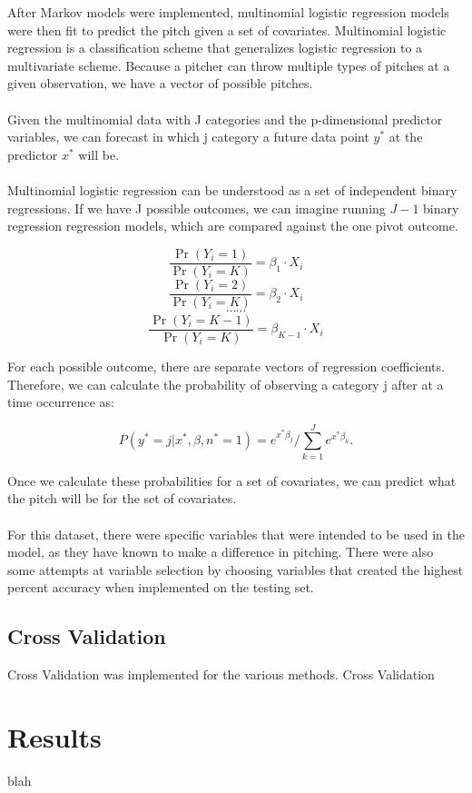 \documentclass{article}
\begin{document}
After Markov models were implemented, multinomial logistic regression models were then fit to predict the pitch given a set of covariates. Multinomial logistic regression is a classification scheme that generalizes logistic regression to a multivariate scheme. Because a pitcher can throw multiple types of pitches at a given observation, we have a vector of possible pitches. \\
\\ 
Given the multinomial data with J categories and the p-dimensional predictor variables, we can forecast in which j category a future data point $y^*$ at the predictor $x^*$ will be. \\
\\
Multinomial logistic regression can be understood as a set of independent binary regressions. If we have J possible outcomes, we can imagine running $J-1$ binary regression regression models, which are compared against the one pivot outcome. 

$$ \frac{\Pr(Y_i=1)}{\Pr(Y_i=K)} = \beta_1 \cdot {X}_i $$
$$ \frac{\Pr(Y_i=2)}{\Pr(Y_i=K)} = \beta_2 \cdot {X}_i $$
$$ \cdots \cdots$$ 
$$ \frac{\Pr(Y_i=K-1)}{\Pr(Y_i=K)} = \beta_{K-1} \cdot {X}_i$$ 

\noindent For each possible outcome, there are separate vectors of regression coefficients. Therefore, we can calculate the probability of observing a category j after at a time occurrence as: 

$$ P(y^* = j | x^*, \beta, n^* = 1 ) = e^{x^* \beta_j} / \sum_{k=1}^{J} e^{x^* \beta_k}. $$

\noindent Once we calculate these probabilities for a set of covariates, we can predict what the pitch will be for the set of covariates.  \\ 
\\ 
For this dataset, there were specific variables that were intended to be used in the model, as they have known to make a difference in pitching. There were also some attempts at variable selection by choosing variables that created the highest percent accuracy when implemented on the testing set. 

\subsection{Cross Validation}

Cross Validation was implemented for the various methods. Cross Validation 

\section{Results}
blah
\end{document}
